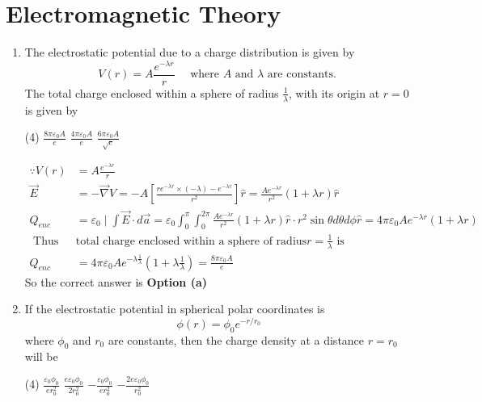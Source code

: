 \chapter{Electromagnetic Theory}
\begin{enumerate}
	\item  The electrostatic potential due to a charge distribution is given by
	$$
	V(r)=A \frac{e^{-\lambda r}}{r} \quad \text { where } A \text { and } \lambda \text { are constants. }
	$$
	The total charge enclosed within a sphere of radius $\frac{1}{\lambda}$, with its origin at $r=0$ is given by
	 \begin{tasks}(4)
		\task[\textbf{a.}] $\frac{8 \pi \varepsilon_{0} A}{e}$
		\task[\textbf{b.}]$\frac{4 \pi \varepsilon_{0} A}{e}$
		\task[\textbf{c.}]$\frac{6 \pi \varepsilon_{0} A}{\sqrt{e}}$
	\end{tasks}
\begin{answer}
	$$
	\begin{aligned}
	\because V(r)&=A \frac{e^{-\lambda r}}{r}\\
	\vec{E}&=-\vec{\nabla} V=-A\left[\frac{r e^{-\lambda r} \times(-\lambda)-e^{-\lambda r}}{r^{2}}\right] \hat{r}=\frac{A e^{-\lambda r}}{r^{2}}(1+\lambda r) \hat{r}\\
	Q_{e n c}&=\varepsilon_{0} \mid \int \vec{E} \cdot d \vec{a}=\varepsilon_{0} \int_{0}^{\pi} \int_{0}^{2 \pi} \frac{A e^{-\lambda r}}{r^{2}}(1+\lambda r) \hat{r} \cdot r^{2} \sin \theta d \theta d \phi \hat{r}=4 \pi \varepsilon_{0} A e^{-\lambda r}(1+\lambda r)\\
	\text { Thus  } &\text{total charge  enclosed within a sphere of radius}r=\frac{1}{\lambda} \text { is }\\
	Q_{e n c}&=4 \pi \varepsilon_{0} A e^{-\lambda \frac{1}{\lambda}}\left(1+\lambda \frac{1}{\lambda}\right)=\frac{8 \pi \varepsilon_{0} A}{e}
\end{aligned}
$$
So the correct answer is \textbf{Option (a)}
\end{answer}
\item  If the electrostatic potential in spherical polar coordinates is
$$
\phi(r)=\phi_{0} e^{-r / r_{0}}
$$
where $\phi_{0}$ and $r_{0}$ are constants, then the charge density at a distance $r=r_{0}$ will be	
 \begin{tasks}(4)
	\task[\textbf{a.}]$\frac{\varepsilon_{0} \phi_{0}}{e r_{0}^{2}}$
	\task[\textbf{b.}]$\frac{e \varepsilon_{0} \phi_{0}}{2 r_{0}^{2}}$
	\task[\textbf{c.}]$-\frac{\varepsilon_{0} \phi_{0}}{e r_{0}^{2}}$
	\task[\textbf{d.}] $-\frac{2 e \varepsilon_{0} \phi_{0}}{r_{0}^{2}}$

\end{tasks}
\end{enumerate}

